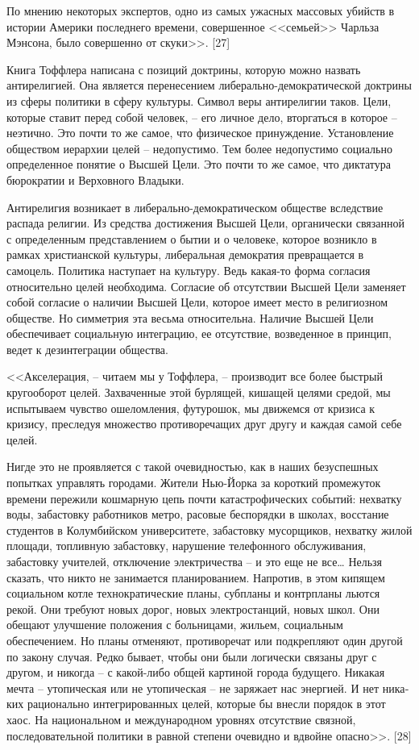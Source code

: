 \documentclass{book}
\begin{document}
По мнению некоторых экспертов, одно из самых ужасных массовых убийств в истории Америки последнего времени, совершенное <<семьей>> Чарльза Мэнсона, было совершенно от скуки>>. [27]

Книга Тоффлера написана с позиций доктрины, которую мож­но назвать антирелигией.  Она является перенесением либераль­но-демократической доктрины из сферы политики в сферу культуры. Символ веры антирелигии таков. Цели, которые ставит перед собой человек, -- его личное дело, вторгаться в которое -- неэтично. Это почти то же самое, что физическое принуждение. Установление обществом иерархии целей -- недопустимо. Тем более недопустимо социально определенное понятие о Высшей Цели. Это почти то же самое, что диктатура бюрократии и Вер­ховного Владыки.

Антирелигия возникает в либерально-демократическом об­ществе вследствие распада религии. Из средства достижения Высшей Цели, органически связанной с определенным пред­ставлением о бытии и о человеке, которое возникло в рамках христианской культуры, либеральная демократия превращает­ся в самоцель. Политика наступает на культуру. Ведь какая-то форма согласия относительно целей необходима. Согласие об отсутствии Высшей Цели заменяет собой согласие о наличии Высшей Цели, которое имеет место в религиозном обществе. Но симметрия эта весьма относительна. Наличие Высшей Цели обеспечивает социальную интеграцию, ее отсутствие, возведен­ное в принцип, ведет к дезинтеграции общества.

<<Акселерация, -- читаем мы у Тоффлера, -- производит все более быстрый кругооборот целей. Захваченные этой бурлящей, кишащей целями средой, мы испытываем чувство ошеломле­ния, футурошок, мы движемся от кризиса к кризису, пресле­дуя множество противоречащих друг другу и каждая самой себе целей.

Нигде это не проявляется с такой очевидностью, как в наших безуспешных попытках управлять городами. Жители Нью-Йорка за короткий промежуток времени пережили кошмарную цепь почти катастрофических событий: нехватку воды, забастовку работников метро, расовые беспорядки в школах, восстание студентов в Колумбийском университете, забастовку мусорщиков, нехватку жилой площади, топливную забастовку, нарушение телефонного обслуживания, забастовку учителей, отключение электричества -- и это еще не все\ldots
Нельзя сказать, что никто не занимается планированием. Напротив, в этом кипящем социальном котле технократические планы, субпланы и контрпланы льются рекой. Они требуют новых дорог, новых электростанций, новых школ. Они обещают улучшение положения с больницами, жильем, социальным обеспечением. Но планы отменяют, противоречат или подкрепляют один другой по закону случая. Редко бывает, чтобы они были логически связаны друг с другом, и никогда -- с какой-либо общей картиной города будущего. Никакая мечта -- утопиче­ская или не утопическая -- не заряжает нас энергией. И нет ника­ких рационально интегрированных целей, которые бы внесли порядок в этот хаос. На национальном и международном уров­нях отсутствие связной, последовательной политики в равной степени очевидно и вдвойне опасно>>. [28] 
\end{document}
